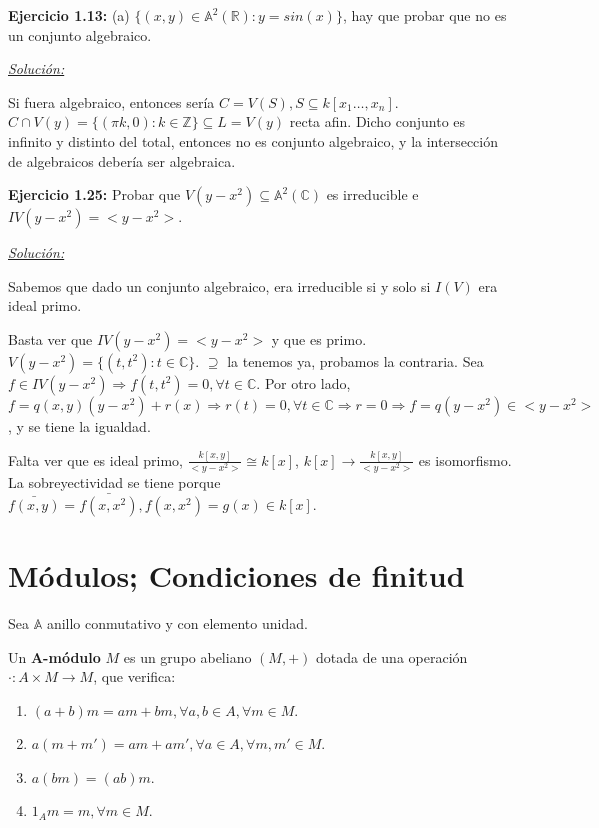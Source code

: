 \textbf{Ejercicio 1.13: } (a) $\{(x,y) \in \mathbb{A}^2(\mathbb{R}) : y= sin(x)\}$, hay que probar que no es un conjunto algebraico.

\underline{\textit{Solución: }}

Si fuera algebraico, entonces sería $C=V(S), S\subseteq k[x_1\dots, x_n]$. $C\cap V(y)=\{(\pi k,0): k\in \mathbb{Z} \} \subseteq L=V(y)$ recta afin. Dicho conjunto es infinito y distinto del total, entonces no es conjunto algebraico, y la intersección de algebraicos debería ser algebraica.

\textbf{Ejercicio 1.25: } Probar que $V(y-x^2)\subseteq \mathbb{A}^2(\mathbb{C})$ es irreducible e $IV(y-x^2)=<y-x^2>$.

\underline{\textit{Solución: }}

\begin{nota}
Sabemos que dado un conjunto algebraico, era irreducible si y solo si $I(V)$ era ideal primo.
\end{nota}

Basta ver que $IV(y-x^2)=<y-x^2>$ y que es primo.  $V(y-x^2)=\{(t,t^2): t\in \mathbb{C} \}$. $\supseteq $ la tenemos ya, probamos la contraria. Sea $f\in IV(y-x^2) \Rightarrow f(t,t^2)=0, \forall t \in \mathbb{C}$. Por otro lado, $f=q(x,y)(y-x^2)+r(x) \Rightarrow r(t)=0, \forall t\in \mathbb{C} \Rightarrow r=0 \Rightarrow f=q(y-x^2)\in <y-x^2>$, y se tiene la igualdad.

Falta ver que es ideal primo, $\frac{k[x,y]}{<y-x^2>} \cong k[x]$, $k[x]\rightarrow \frac{k[x,y]}{<y-x^2>}$ es isomorfismo. La sobreyectividad se tiene porque $\bar{f(x,y)}=\bar{f(x,x^2)}, f(x,x^2)=g(x)\in k[x]$.

\section{Módulos; Condiciones de finitud}

Sea $\mathbb{A}$ anillo conmutativo y con elemento  unidad.


\begin{Def}
Un \textbf{A-módulo} $M$ es un grupo abeliano $(M,+)$ dotada de una operación $\cdot: A\times M \rightarrow M$, que verifica:

\begin{enumerate}
\item $(a+b)m=am+bm, \forall a , b \in A, \forall m\in M$.
\item $a(m+m')=am+am', \forall a \in A , \forall m, m'\in M$.
\item $a(bm)=(ab)m$.
\item $1_A m = m, \forall m \in M$.
\end{enumerate}
\end{Def}

